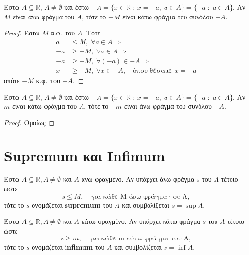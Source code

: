 \begin{mybox3}
\begin{prop}
  Έστω $ A \subseteq \mathbb{R}$, $A \neq \emptyset $ και έστω 
  $ -A = \{ x \in \mathbb{R} \; : \; x = -a, \; a \in A \} = \{ 
  -a \; : \; a \in A\} $. Αν $M$ είναι άνω φράγμα 
  του $A$, τότε το $ -M $ είναι κάτω φράγμα του συνόλου $ -A $.
\end{prop}
\end{mybox3}
\begin{proof}
  Έστω $M$ α.φ.\ του $A$. Τότε 
  \begin{align*}
    a &\leq M, \; \forall a \in A \Rightarrow  \\
    -a &\geq -M, \; \forall a \in A \Rightarrow \\
    -a &\geq -M, \; \forall (-a) \in -A \Rightarrow \\
    x &\geq -M, \; \forall x \in -A, \quad \text{όπου θέσαμε } x=-a 
  \end{align*}
  οπότε $ -M $  κ.φ.\ του $ -A $.
\end{proof}

\begin{mybox3}
\begin{prop}
  Έστω $ A \subseteq \mathbb{R}$, $A \neq \emptyset $ και έστω 
  $ -A = \{ x \in \mathbb{R} \; : \; x = -a, \; a \in A \} = \{ 
  -a \; : \; a \in A\} $. Αν $m$ είναι κάτω  φράγμα 
  του $A$, τότε το $ -m $ είναι άνω  φράγμα του συνόλου $ -A $.
\end{prop}
\end{mybox3}
\begin{proof}
Ομοίως  
\end{proof}


\section{Supremum και Infimum}

\begin{mybox1}
\begin{dfn}
  Έστω $ A \subseteq \mathbb{R}, A \neq \emptyset $ και $A$ άνω 
  φραγμένο. Αν υπάρχει άνω φράγμα $s$ του $A$ τέτοιο ώστε 
  \[
    s \leq M, \quad \text{για κάθε M άνω φράγμα του A}, 
  \] 
  τότε το $s$ ονομάζεται \textbf{supremum} του $A$ και συμβολίζεται $ s=\sup A $.
\end{dfn}
\end{mybox1}

\begin{mybox1}
\begin{dfn}
  Έστω $ A \subseteq \mathbb{R}, A \neq \emptyset $ και $A$ κάτω 
  φραγμένο. Αν υπάρχει κάτω φράγμα $s$ του $A$ τέτοιο ώστε 
  \[
    s \geq m, \quad \text{για κάθε m κάτω φράγμα του A}, 
  \] 
  τότε το $s$ ονομάζεται \textbf{infimum} του $A$ και συμβολίζεται $ s=\inf A $.
\end{dfn}
\end{mybox1}


